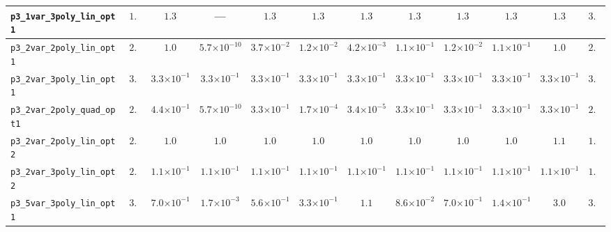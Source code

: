 \begin{landscape}
\begin{table}[H]
{\begin{tabular}{lccccccccccc}
\hline
\texttt{p3\_1var\_3poly\_lin\_opt1} & $1.4$ & \textbf{$1.3$} & --- & \textbf{$1.3$} & \textbf{$1.3$} & \textbf{$1.3$} & \textbf{$1.3$} & \textbf{$1.3$} & \textbf{$1.3$} & $1.3$ & $3.0$ \\
\hline
\texttt{p3\_2var\_2poly\_lin\_opt1} & $2.0$ & $1.0$ & \textbf{$5.7{\scriptstyle\times 10^{-10}}$} & $3.7{\scriptstyle\times 10^{-2}}$ & $1.2{\scriptstyle\times 10^{-2}}$ & $4.2{\scriptstyle\times 10^{-3}}$ & $1.1{\scriptstyle\times 10^{-1}}$ & $1.2{\scriptstyle\times 10^{-2}}$ & $1.1{\scriptstyle\times 10^{-1}}$ & $1.0$ & $2.0$ \\
\hline
\texttt{p3\_2var\_3poly\_lin\_opt1} & $3.0$ & $3.3{\scriptstyle\times 10^{-1}}$ & \textbf{$3.3{\scriptstyle\times 10^{-1}}$} & $3.3{\scriptstyle\times 10^{-1}}$ & $3.3{\scriptstyle\times 10^{-1}}$ & $3.3{\scriptstyle\times 10^{-1}}$ & $3.3{\scriptstyle\times 10^{-1}}$ & $3.3{\scriptstyle\times 10^{-1}}$ & $3.3{\scriptstyle\times 10^{-1}}$ & $3.3{\scriptstyle\times 10^{-1}}$ & $3.0$ \\
\hline
\texttt{p3\_2var\_2poly\_quad\_opt1} & $2.0$ & $4.4{\scriptstyle\times 10^{-1}}$ & \textbf{$5.7{\scriptstyle\times 10^{-10}}$} & $3.3{\scriptstyle\times 10^{-1}}$ & $1.7{\scriptstyle\times 10^{-4}}$ & $3.4{\scriptstyle\times 10^{-5}}$ & $3.3{\scriptstyle\times 10^{-1}}$ & $3.3{\scriptstyle\times 10^{-1}}$ & $3.3{\scriptstyle\times 10^{-1}}$ & $3.3{\scriptstyle\times 10^{-1}}$ & $2.0$ \\
\hline
\texttt{p3\_2var\_2poly\_lin\_opt2} & $2.0$ & \textbf{$1.0$} & \textbf{$1.0$} & \textbf{$1.0$} & \textbf{$1.0$} & \textbf{$1.0$} & \textbf{$1.0$} & \textbf{$1.0$} & \textbf{$1.0$} & $1.1$ & $1.0$ \\
\hline
\texttt{p3\_2var\_3poly\_lin\_opt2} & $2.1$ & \textbf{$1.1{\scriptstyle\times 10^{-1}}$} & \textbf{$1.1{\scriptstyle\times 10^{-1}}$} & \textbf{$1.1{\scriptstyle\times 10^{-1}}$} & \textbf{$1.1{\scriptstyle\times 10^{-1}}$} & \textbf{$1.1{\scriptstyle\times 10^{-1}}$} & \textbf{$1.1{\scriptstyle\times 10^{-1}}$} & \textbf{$1.1{\scriptstyle\times 10^{-1}}$} & \textbf{$1.1{\scriptstyle\times 10^{-1}}$} & $1.1{\scriptstyle\times 10^{-1}}$ & $1.3$ \\
\hline
\texttt{p3\_5var\_3poly\_lin\_opt1} & $3.0$ & $7.0{\scriptstyle\times 10^{-1}}$ & \textbf{$1.7{\scriptstyle\times 10^{-3}}$} & $5.6{\scriptstyle\times 10^{-1}}$ & $3.3{\scriptstyle\times 10^{-1}}$ & $1.1$ & $8.6{\scriptstyle\times 10^{-2}}$ & $7.0{\scriptstyle\times 10^{-1}}$ & $1.4{\scriptstyle\times 10^{-1}}$ & $3.0$ & $3.0$ \\

\end{tabular}}
\end{table}
\end{landscape}
